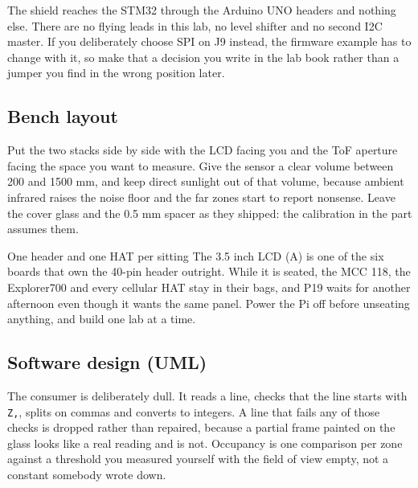 The shield reaches the STM32 through the Arduino UNO headers and nothing else. There are
no flying leads in this lab, no level shifter and no second I2C master. If you deliberately
choose SPI on J9 instead, the firmware example has to change with it, so make that a
decision you write in the lab book rather than a jumper you find in the wrong position
later.

\subsection*{Bench layout}


Put the two stacks side by side with the LCD facing you and the ToF aperture facing the
space you want to measure. Give the sensor a clear volume between 200 and 1500 mm, and
keep direct sunlight out of that volume, because ambient infrared raises the noise floor
and the far zones start to report nonsense. Leave the cover glass and the 0.5 mm spacer
as they shipped: the calibration in the part assumes them.

\begin{note}{One header and one HAT per sitting}
The 3.5 inch LCD (A) is one of the six boards that own the 40-pin header outright. While
it is seated, the MCC 118, the Explorer700 and every cellular HAT stay in their bags, and
P19 waits for another afternoon even though it wants the same panel. Power the Pi off
before unseating anything, and build one lab at a time.
\end{note}

\subsection*{Software design (UML)}


The consumer is deliberately dull. It reads a line, checks that the line starts with
\texttt{Z,}, splits on commas and converts to integers. A line that fails any of those
checks is dropped rather than repaired, because a partial frame painted on the glass
looks like a real reading and is not. Occupancy is one comparison per zone against a
threshold you measured yourself with the field of view empty, not a constant somebody
wrote down.

